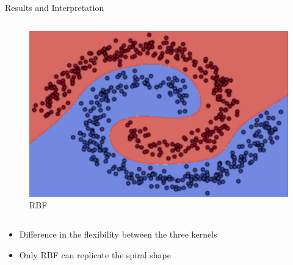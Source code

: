 \documentclass[9.5pt]{beamer}
\begin{document}
\begin{frame}[fragile]{Results and Interpretation}
\begin{columns}[onlytextwidth]
\begin{figure}
                \centering
                \includegraphics[width=\linewidth]{image-20220624192258535}
                \caption{RBF}
            \end{figure}
        \end{columns}

        \bigskip
        \bigskip

        \centering
        \small
        \begin{itemize}
            \item Difference in the flexibility between the three kernels
            \item Only RBF can replicate the spiral shape
        \end{itemize}
    \end{frame}
\end{document}
